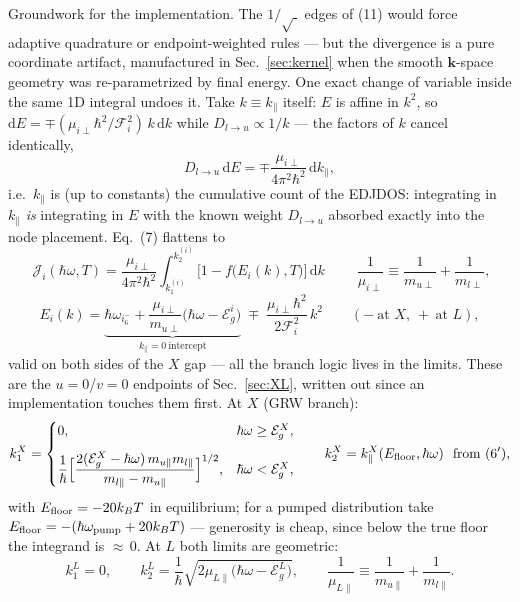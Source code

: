 \documentclass[11pt,a4paper]{article}
\numberwithin{equation}{section}
\newcommand{\hw}{\hbar\omega}
\newcommand{\Eg}{\mathcal{E}_g}
\newcommand{\EgX}{\mathcal{E}_g^{X}}
\newcommand{\EgL}{\mathcal{E}_g^{L}}
\newcommand{\cF}{\mathcal{F}}
\newcommand{\cJ}{\mathcal{J}}
\newcommand{\kpar}{k_{\parallel}}
\newcommand{\dd}{\mathrm{d}}
\newcommand{\Dlu}{D_{l\to u}}
\newcommand{\fFD}{f}
\newcommand{\kB}{k_B}
\begin{document}
Groundwork for the implementation.  The $1/\sqrt{\;}$ edges of (11)
would force adaptive quadrature or endpoint-weighted rules --- but the
divergence is a pure coordinate artifact, manufactured in
Sec.~\ref{sec:kernel} when the smooth $\mathbf k$-space geometry was
re-parametrized by final energy.  One exact change of variable inside
the same 1D integral undoes it.  Take $k\equiv\kpar$ itself: $E$ is
affine in $k^2$, so $\dd E=\mp(\mu_{i\perp}\hbar^2/\cF_i^2)\,k\,\dd k$
while $\Dlu\propto1/k$ --- the factors of $k$ cancel identically,
\begin{equation}
\Dlu\,\dd E=\mp\frac{\mu_{i\perp}}{4\pi^2\hbar^2}\,\dd\kpar ,
\end{equation}
i.e.\ $\kpar$ is (up to constants) the cumulative count of the
EDJDOS: integrating in $\kpar$ \emph{is} integrating in $E$ with the
known weight $\Dlu$ absorbed exactly into the node placement.
Eq.~(7) flattens to
\begin{equation}
\boxed{\;
\cJ_i(\hw,T)=\frac{\mu_{i\perp}}{4\pi^{2}\hbar^{2}}
\int_{k_1^{(i)}}^{k_2^{(i)}}
\bigl[1-\fFD\bigl(E_i(k),T\bigr)\bigr]\,\dd k
\;}
\qquad
\frac{1}{\mu_{i\perp}}\equiv\frac{1}{m_{u\perp}}+\frac{1}{m_{l\perp}},
\tag{12}
\label{eq:k12}
\end{equation}
\begin{equation}
E_i(k)=\underbrace{\hbar\omega_{i_6^-}
+\frac{\mu_{i\perp}}{m_{u\perp}}\bigl(\hw-\Eg^{i}\bigr)}_{\kpar=0\
\text{intercept}}
\;\mp\;\frac{\mu_{i\perp}\hbar^{2}}{2\cF_i^{2}}\,k^{2}
\qquad(-\ \text{at }X,\ +\ \text{at }L),
\label{eq:Eofk}
\end{equation}
valid on both sides of the $X$ gap --- all the branch logic lives in
the limits.  These are the $u=0$/$v=0$ endpoints of
Sec.~\ref{sec:XL}, written out since an implementation touches them
first.  At $X$ (GRW branch):
\begin{equation}
k_1^{X}=
\begin{cases}
0, & \hw\ge\EgX,\\[8pt]
\dfrac{1}{\hbar}\Bigl[\dfrac{2(\EgX-\hw)\,m_{u\parallel}m_{l\parallel}}
{m_{l\parallel}-m_{u\parallel}}\Bigr]^{1/2}, & \hw<\EgX ,
\end{cases}
\qquad
k_2^{X}=\kpar^{X}(E_{\rm floor},\hw)\ \ \text{from ($6'$)},
\end{equation}
with $E_{\rm floor}=-20\kB T$ in equilibrium; for a pumped
distribution take $E_{\rm floor}=-(\hbar\omega_{\rm pump}+20\kB T)$
--- generosity is cheap, since below the true floor the integrand is
${\approx}\,0$.  At $L$ both limits are geometric:
\begin{equation}
k_1^{L}=0,\qquad
k_2^{L}=\frac{1}{\hbar}\sqrt{2\mu_{L\parallel}\bigl(\hw-\EgL\bigr)},
\qquad
\frac{1}{\mu_{L\parallel}}\equiv\frac{1}{m_{u\parallel}}
+\frac{1}{m_{l\parallel}} .
\end{equation}
\end{document}
